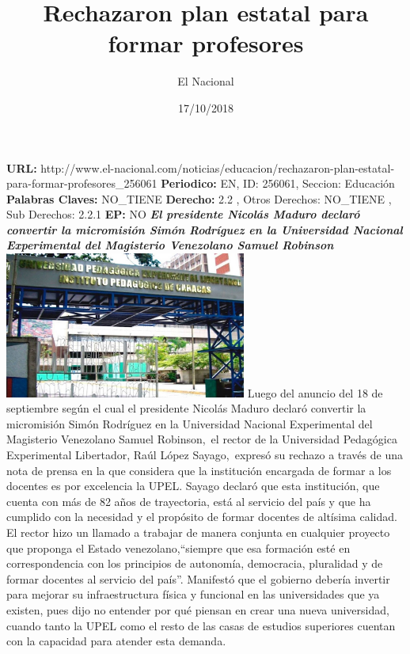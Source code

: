 \documentclass{article}%
\title{\textbf{Rechazaron plan estatal para formar profesores}}%
\author{El Nacional}%
\date{17/10/2018}%
\begin{document}
%
\normalsize%
\maketitle%
\textbf{URL: }%
http://www.el{-}nacional.com/noticias/educacion/rechazaron{-}plan{-}estatal{-}para{-}formar{-}profesores\_256061\newline%
%
\textbf{Periodico: }%
EN, %
ID: %
256061, %
Seccion: %
Educación\newline%
%
\textbf{Palabras Claves: }%
NO\_TIENE\newline%
%
\textbf{Derecho: }%
2.2%
, Otros Derechos: %
NO\_TIENE%
, Sub Derechos: %
2.2.1%
\newline%
%
\textbf{EP: }%
NO\newline%
\newline%
%
\textbf{\textit{El presidente Nicolás Maduro declaró convertir la micromisión Simón Rodríguez en la Universidad Nacional Experimental del Magisterio Venezolano Samuel Robinson}}%
\newline%
\newline%
%
\includegraphics[width=300px]{156.jpg}%
\newline%
%
Luego del anuncio del 18 de septiembre según el cual el presidente Nicolás Maduro declaró convertir la micromisión Simón Rodríguez en la Universidad Nacional Experimental del Magisterio Venezolano Samuel Robinson,~el rector de la Universidad Pedagógica Experimental Libertador, Raúl López Sayago,~expresó su rechazo a través de una nota de prensa en la que considera que la institución encargada de formar a los docentes es por excelencia la UPEL.%
\newline%
%
Sayago declaró que esta institución, que cuenta con más de 82 años de trayectoria, está al servicio del país y que ha cumplido con la necesidad y el propósito de formar docentes de altísima calidad.%
\newline%
%
El rector hizo un llamado a trabajar de manera conjunta en cualquier proyecto que proponga el Estado venezolano,“siempre que esa formación esté en correspondencia con los principios de autonomía, democracia, pluralidad y de formar docentes al servicio del país”.%
\newline%
%
Manifestó que el gobierno debería invertir para mejorar su infraestructura física y funcional en las universidades que ya existen, pues dijo no entender por qué piensan en crear una nueva universidad, cuando tanto la UPEL como el resto de las casas de estudios superiores cuentan con la capacidad para atender esta demanda.%
\newline%
%
\end{document}
